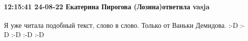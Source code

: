  
 
 
 
 

\paragraph{12:15:41 24-08-22 Екатерина Пирогова (Лозина)ответила vasja}

Я уже читала подобный текст, слово в слово. Только от Ваньки Демидова. :-D :-D :-D :-D :-D
